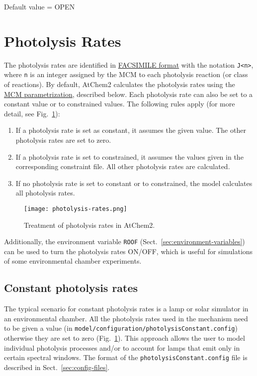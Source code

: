 Default value = OPEN

\section{Photolysis Rates} \label{sec:photolysis-rates}

The photolysis rates are identified in \hyperref[sec:chemical-mechanism]{FACSIMILE format}
with the notation \verb|J<n>|, where \texttt{n} is an integer assigned
by the MCM to each photolysis reaction (or class of reactions).
By default, AtChem2 calculates the photolysis rates using the
\href{http://mcm.leeds.ac.uk/MCM/parameters/photolysis_param.htt}{MCM parametrization},
described below. Each photolysis rate can also be set to a constant
value or to constrained values. The following rules apply (for more
detail, see Fig.~\ref{fig:photol}):

\begin{enumerate}
\item If a photolysis rate is set as constant, it assumes the given
  value. The other photolysis rates are set to zero.
\item If a photolysis rate is set to constrained, it assumes the
  values given in the corresponding constraint file. All other
  photolysis rates are calculated.
\item If no photolysis rate is set to constant or to constrained, the
  model calculates all photolysis rates.
\end{enumerate}

\begin{figure}[htb]
  \centering
  \texttt{[image: photolysis-rates.png]}
  \caption{Treatment of photolysis rates in AtChem2.} \label{fig:photol}
\end{figure}

Additionally, the environment variable \texttt{ROOF}
(Sect.~\ref{sec:environment-variables}) can be used to turn the
photolysis rates ON/OFF, which is useful for simulations of some
environmental chamber experiments.

\subsection{Constant photolysis rates} \label{subsec:constant-photolysis-rates}

The typical scenario for constant photolysis rates is a lamp or solar
simulator in an environmental chamber. All the photolysis rates used
in the mechanism need to be given a value (in
\texttt{model/configuration/photolysisConstant.config}) otherwise they
are set to zero (Fig.~\ref{fig:photol}). This approach allows the user
to model individual photolysis processes and/or to account for lamps
that emit only in certain spectral windows. The format of the
\texttt{photolysisConstant.config} file is described in
Sect.~\ref{sec:config-files}.

